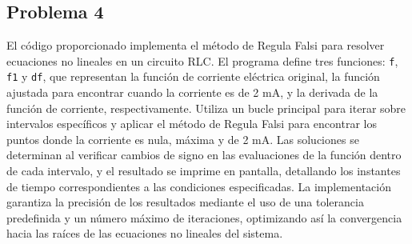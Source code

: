 \documentclass[12pt]{article}
\begin{document}
\subsection{Problema 4}

El código proporcionado implementa el método de Regula Falsi para resolver ecuaciones no lineales en un circuito RLC. El programa define tres funciones: \texttt{f}, \texttt{f1} y \texttt{df}, que representan la función de corriente eléctrica original, la función ajustada para encontrar cuando la corriente es de 2 mA, y la derivada de la función de corriente, respectivamente. Utiliza un bucle principal para iterar sobre intervalos específicos y aplicar el método de Regula Falsi para encontrar los puntos donde la corriente es nula, máxima y de 2 mA. Las soluciones se determinan al verificar cambios de signo en las evaluaciones de la función dentro de cada intervalo, y el resultado se imprime en pantalla, detallando los instantes de tiempo correspondientes a las condiciones especificadas. La implementación garantiza la precisión de los resultados mediante el uso de una tolerancia predefinida y un número máximo de iteraciones, optimizando así la convergencia hacia las raíces de las ecuaciones no lineales del sistema.
\end{document}
